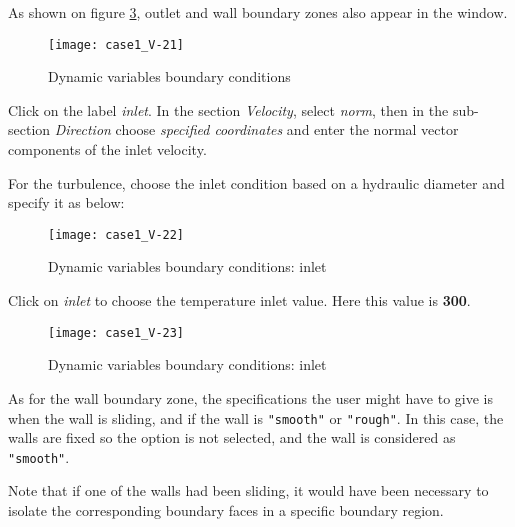 As shown on figure \ref{fig26_e1}, outlet and wall boundary zones also
appear in the window.

\begin{figure}[ht]
\begin{center}
\texttt{[image: case1\_V-21]}
\caption{Dynamic variables boundary conditions}
\label{fig26_e1}
\end{center}
\end{figure}

\clearpage
Click on the label {\itshape inlet}. In the section {\itshape Velocity},
select {\itshape norm}, then in the sub-section {\itshape Direction} choose
{\itshape specified coordinates} and enter the normal vector components of
the inlet velocity.

For the turbulence, choose the inlet condition based on a hydraulic diameter
and specify it as below:\\

\begin{figure}[ht]
\begin{center}
\texttt{[image: case1\_V-22]}
\caption{Dynamic variables boundary conditions: inlet}
\label{fig27_e1}
\end{center}
\end{figure}

Click on {\itshape inlet} to choose the temperature inlet
value. Here this value is {\bf 300}\degresC.
\begin{figure}[ht]
\begin{center}
\texttt{[image: case1\_V-23]}
\caption{Dynamic variables boundary conditions: inlet}
\label{fig26_e1}
\end{center}
\end{figure}

\clearpage
As for the wall boundary zone, the specifications the user might have to
give is when the wall is sliding, and if the wall is \texttt{"smooth"}
or \texttt{"rough"}. In this case, the walls are fixed so the option is
not selected, and the wall is considered as \texttt{"smooth"}.

Note that if one of the walls had been sliding, it would have been necessary to
isolate the corresponding boundary faces in a specific boundary region.

